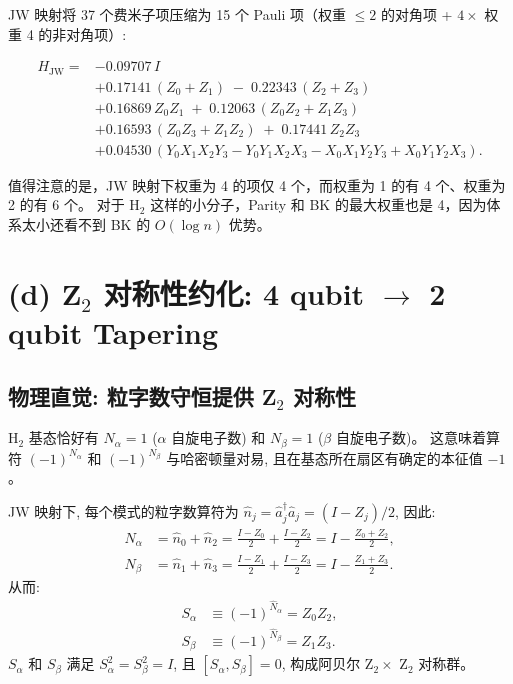 \documentclass[fontset=mac]{ctexart}
\newcommand{\adag}[1]{\hat{a}_{#1}^\dagger}
\newcommand{\aop}[1]{\hat{a}_{#1}}
\newcommand{\Zop}{Z}
\newcommand{\Nop}[1]{\hat{N}_{#1}}
\begin{document}
JW 映射将 37 个费米子项压缩为 15 个 Pauli 项（权重 $\le 2$ 的对角项 + $4\times$ 权重 4 的非对角项）:

\begin{equation}
\begin{aligned}
H_{\text{JW}} = &
    -0.09707\, I \\
    &+0.17141\, (Z_0 + Z_1) \;-\; 0.22343\, (Z_2 + Z_3) \\
    &+0.16869\, Z_0Z_1 \;+\; 0.12063\, (Z_0Z_2 + Z_1Z_3) \\
    &+0.16593\, (Z_0Z_3 + Z_1Z_2) \;+\; 0.17441\, Z_2Z_3 \\
    &+0.04530\, (Y_0 X_1 X_2 Y_3 - Y_0 Y_1 X_2 X_3
                   - X_0 X_1 Y_2 Y_3 + X_0 Y_1 Y_2 X_3).
\end{aligned}
\end{equation}

值得注意的是，JW 映射下权重为 4 的项仅 4 个，而权重为 1 的有 4 个、权重为 2 的有 6 个。
对于 H$_2$ 这样的小分子，Parity 和 BK 的最大权重也是 4，因为体系太小还看不到 BK 的 $O(\log n)$ 优势。

\section*{(d) Z$_2$ 对称性约化: 4 qubit $\to$ 2 qubit Tapering}

\subsection*{物理直觉: 粒字数守恒提供 Z$_2$ 对称性}

H$_2$ 基态恰好有 $N_\alpha = 1$ ($\alpha$ 自旋电子数) 和 $N_\beta = 1$ ($\beta$ 自旋电子数)。
这意味着算符 $(-1)^{N_\alpha}$ 和 $(-1)^{N_\beta}$ 与哈密顿量对易,
且在基态所在扇区有确定的本征值 $-1$。

JW 映射下, 每个模式的粒字数算符为 $\hat{n}_j = \adag{j} \aop{j} = (I - \Zop_j)/2$,
因此:
\begin{align}
    \Nop{\alpha} &= \hat{n}_0 + \hat{n}_2
                  = \frac{I - \Zop_0}{2} + \frac{I - \Zop_2}{2}
                  = I - \frac{\Zop_0 + \Zop_2}{2}, \\[4pt]
    \Nop{\beta}  &= \hat{n}_1 + \hat{n}_3
                  = \frac{I - \Zop_1}{2} + \frac{I - \Zop_3}{2}
                  = I - \frac{\Zop_1 + \Zop_3}{2}.
\end{align}
从而:
\begin{align}
    S_\alpha &\equiv (-1)^{\Nop{\alpha}} = \Zop_0 \Zop_2, \\
    S_\beta  &\equiv (-1)^{\Nop{\beta}}  = \Zop_1 \Zop_3.
\end{align}
$S_\alpha$ 和 $S_\beta$ 满足 $S_\alpha^2 = S_\beta^2 = I$, 且 $[S_\alpha, S_\beta] = 0$,
构成阿贝尔 Z$_2 \times$ Z$_2$ 对称群。
\end{document}
